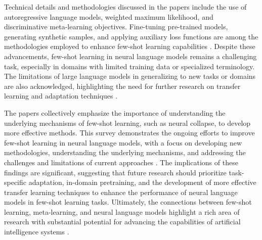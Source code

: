 \documentclass[conference]{IEEEtran}
\begin{document}
Technical details and methodologies discussed in the papers include the use of autoregressive language models, weighted maximum likelihood, and discriminative meta-learning objectives. Fine-tuning pre-trained models, generating synthetic samples, and applying auxiliary loss functions are among the methodologies employed to enhance few-shot learning capabilities \cite{b6}. Despite these advancements, few-shot learning in neural language models remains a challenging task, especially in domains with limited training data or specialized terminology. The limitations of large language models in generalizing to new tasks or domains are also acknowledged, highlighting the need for further research on transfer learning and adaptation techniques \cite{b7}.

The papers collectively emphasize the importance of understanding the underlying mechanisms of few-shot learning, such as neural collapse, to develop more effective methods. This survey demonstrates the ongoing efforts to improve few-shot learning in neural language models, with a focus on developing new methodologies, understanding the underlying mechanisms, and addressing the challenges and limitations of current approaches \cite{b8}. The implications of these findings are significant, suggesting that future research should prioritize task-specific adaptation, in-domain pretraining, and the development of more effective transfer learning techniques to enhance the performance of neural language models in few-shot learning tasks. Ultimately, the connections between few-shot learning, meta-learning, and neural language models highlight a rich area of research with substantial potential for advancing the capabilities of artificial intelligence systems \cite{b9}.
\end{document}
